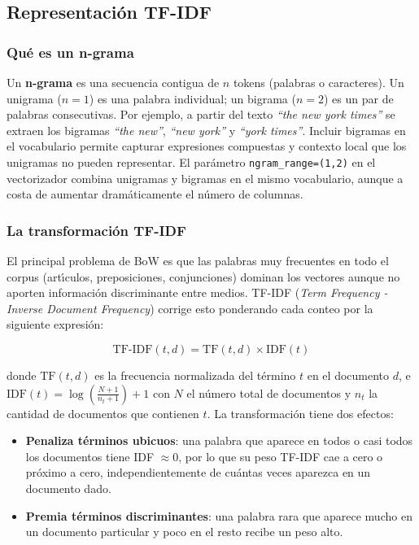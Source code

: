 \documentclass[11pt,a4paper]{article}
\begin{document}
\subsection{Representaci\'{o}n TF-IDF}

\subsubsection*{Qu\'{e} es un n-grama}

Un \textbf{n-grama} es una secuencia contigua de $n$ tokens (palabras o caracteres). Un unigrama ($n=1$) es una palabra individual; un bigrama ($n=2$) es un par de palabras consecutivas. Por ejemplo, a partir del texto \textit{``the new york times''} se extraen los bigramas \textit{``the new''}, \textit{``new york''} y \textit{``york times''}. Incluir bigramas en el vocabulario permite capturar expresiones compuestas y contexto local que los unigramas no pueden representar. El par\'{a}metro \texttt{ngram\_range=(1,2)} en el vectorizador combina unigramas y bigramas en el mismo vocabulario, aunque a costa de aumentar dram\'{a}ticamente el n\'{u}mero de columnas.

\subsubsection*{La transformaci\'{o}n TF-IDF}

El principal problema de BoW es que las palabras muy frecuentes en todo el corpus (art\'{\i}culos, preposiciones, conjunciones) dominan los vectores aunque no aporten informaci\'{o}n discriminante entre medios. TF-IDF (\textit{Term Frequency - Inverse Document Frequency}) corrige esto ponderando cada conteo por la siguiente expresi\'{o}n:

\[
\text{TF-IDF}(t, d) = \text{TF}(t, d) \times \text{IDF}(t)
\]

donde $\text{TF}(t, d)$ es la frecuencia normalizada del t\'{e}rmino $t$ en el documento $d$, e $\text{IDF}(t) = \log\!\left(\frac{N+1}{n_t+1}\right) + 1$ con $N$ el n\'{u}mero total de documentos y $n_t$ la cantidad de documentos que contienen $t$. La transformaci\'{o}n tiene dos efectos:
\begin{itemize}
    \item \textbf{Penaliza t\'{e}rminos ubicuos}: una palabra que aparece en todos o casi todos los documentos tiene IDF $\approx 0$, por lo que su peso TF-IDF cae a cero o pr\'{o}ximo a cero, independientemente de cu\'{a}ntas veces aparezca en un documento dado.
    \item \textbf{Premia t\'{e}rminos discriminantes}: una palabra rara que aparece mucho en un documento particular y poco en el resto recibe un peso alto.
\end{itemize}
\end{document}
